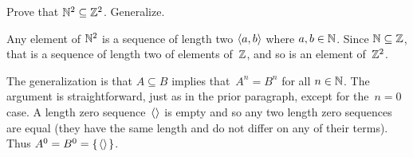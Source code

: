 \documentclass{ibl}  %
\begin{document}
\begin{problem}
Prove that $\mathbb{N}^2\subseteq \mathbb{Z}^2$.
Generalize. 
\begin{answer}
Any element of $\mathbb{N}^2$ is a sequence of length two $\langle a,b\rangle$ where
$a,b\in\mathbb{N}$.
Since $\mathbb{N}\subseteq\mathbb{Z}$, that is a sequence of length two of elements of~$\mathbb{Z}$, 
and so is an element of~$\mathbb{Z}^2$.

The generalization is that $A\subseteq B$ implies that~$A^n=B^n$ for all 
$n\in\mathbb{N}$.
The argument is straightforward, just as in the prior paragraph,
except for the~$n=0$ case.
A length zero sequence~$\langle\rangle$ is empty and so any two 
length zero sequences are equal (they have the same length and do not 
differ on any of their terms).
Thus $A^0=B^0=\mbox{$\{\hspace{0.1em}\langle\rangle\hspace{0.1em}\}$}$.
\end{answer}
\end{problem}
\end{document}
